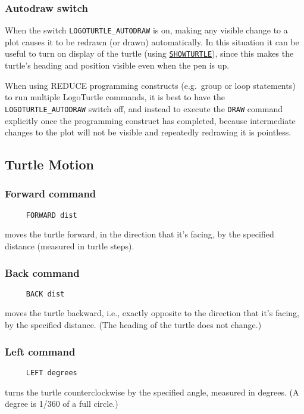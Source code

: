 \subsubsection*{Autodraw switch}
When the switch \texttt{LOGOTURTLE\_AUTODRAW} is on, making any
visible change to a plot causes it to be redrawn (or drawn)
automatically.  In this situation it can be useful to turn on display
of the turtle (using
\hyperref[logoturtle:showturtle]{\texttt{SHOWTURTLE}}), since this
makes the turtle's heading and position visible even when the pen is
up.

When using REDUCE programming constructs (e.g.\ group or loop
statements) to run multiple LogoTurtle commands, it is best to have
the \texttt{LOGOTURTLE\_AUTODRAW} switch off, and instead to execute
the \texttt{DRAW} command explicitly once the programming construct
has completed, because intermediate changes to the plot will not be
visible and repeatedly redrawing it is pointless.


\subsection{Turtle Motion}

\subsubsection*{Forward command}
\begin{verbatim}
     FORWARD dist
\end{verbatim}
moves the turtle forward, in the direction that it's facing, by the
specified distance (measured in turtle steps).

\subsubsection*{Back command}
\begin{verbatim}
     BACK dist
\end{verbatim}
moves the turtle backward, i.e., exactly opposite to the direction
that it's facing, by the specified distance.  (The heading of the
turtle does not change.)

\subsubsection*{Left command}
\begin{verbatim}
     LEFT degrees
\end{verbatim}
turns the turtle counterclockwise by the specified angle, measured in
degrees.  (A degree is 1/360 of a full circle.)

